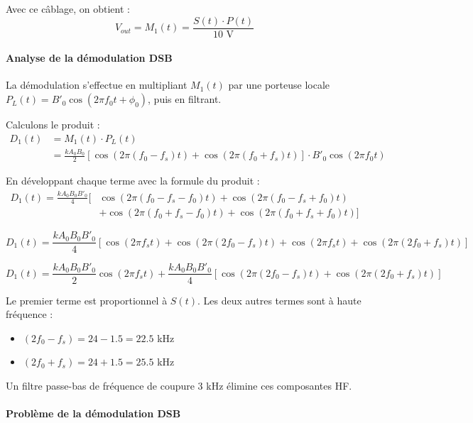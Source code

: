 \documentclass[11pt,a4paper]{article}
\begin{document}
Avec ce câblage, on obtient :
\begin{equation}
\boxed{V_{out} = M_1(t) = \frac{S(t) \cdot P(t)}{10 \text{ V}}}
\end{equation}

\paragraph{Analyse de la démodulation DSB}

La démodulation s'effectue en multipliant $M_1(t)$ par une porteuse locale $P_L(t) = B'_0 \cos(2\pi f_0 t + \phi_0)$, puis en filtrant.

Calculons le produit :
\begin{align}
D_1(t) &= M_1(t) \cdot P_L(t) \\
&= \frac{k A_0 B_0}{2}[\cos(2\pi(f_0-f_s)t) + \cos(2\pi(f_0+f_s)t)] \cdot B'_0 \cos(2\pi f_0 t)
\end{align}

En développant chaque terme avec la formule du produit :
\begin{align}
D_1(t) = \frac{k A_0 B_0 B'_0}{4} [&\cos(2\pi(f_0-f_s-f_0)t) + \cos(2\pi(f_0-f_s+f_0)t) \\
&+ \cos(2\pi(f_0+f_s-f_0)t) + \cos(2\pi(f_0+f_s+f_0)t)]
\end{align}

\begin{equation}
D_1(t) = \frac{k A_0 B_0 B'_0}{4} [\cos(2\pi f_s t) + \cos(2\pi(2f_0-f_s)t) + \cos(2\pi f_s t) + \cos(2\pi(2f_0+f_s)t)]
\end{equation}

\begin{equation}
\boxed{D_1(t) = \frac{k A_0 B_0 B'_0}{2} \cos(2\pi f_s t) + \frac{k A_0 B_0 B'_0}{4}[\cos(2\pi(2f_0-f_s)t) + \cos(2\pi(2f_0+f_s)t)]}
\end{equation}

Le premier terme est proportionnel à $S(t)$. Les deux autres termes sont à haute fréquence :
\begin{itemize}
    \item $(2f_0 - f_s) = 24 - 1.5 = 22.5$ kHz
    \item $(2f_0 + f_s) = 24 + 1.5 = 25.5$ kHz
\end{itemize}

Un filtre passe-bas de fréquence de coupure 3 kHz élimine ces composantes HF.

\paragraph{Problème de la démodulation DSB}
\end{document}
